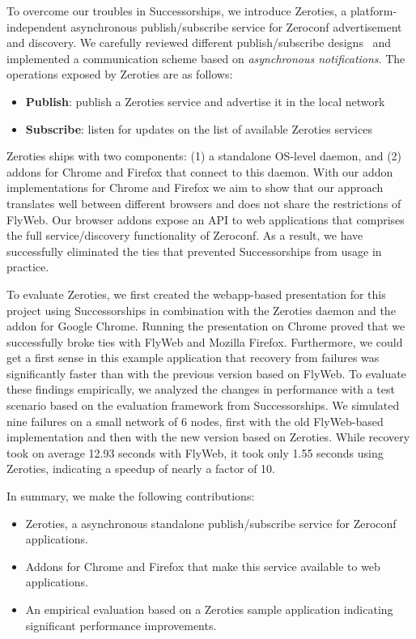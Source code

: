 To overcome our troubles in Successorships, we introduce Zeroties, a platform-independent asynchronous publish/subscribe service for Zeroconf advertisement and discovery.
We carefully reviewed different publish/subscribe designs~\cite{eugster_2003} and implemented a communication scheme based on \textit{asynchronous notifications}.
The operations exposed by Zeroties are as follows:
\begin{itemize}
    \item \textbf{Publish}: publish a Zeroties service and advertise it in the local network
    \item \textbf{Subscribe}: listen for updates on the list of available Zeroties services
\end{itemize}

Zeroties ships with two components: (1) a standalone OS-level daemon, and (2) addons for Chrome and Firefox that connect to this daemon.
With our addon implementations for Chrome and Firefox we aim to show that our approach translates well between different browsers and does not share the restrictions of FlyWeb.
Our browser addons expose an API to web applications that comprises the full service/discovery functionality of Zeroconf.
As a result, we have successfully eliminated the ties that prevented Successorships from usage in practice.

To evaluate Zeroties, we first created the webapp-based presentation for this project using Successorships in combination with the Zeroties daemon and the addon for Google Chrome.
Running the presentation on Chrome proved that we successfully broke ties with FlyWeb and Mozilla Firefox.
Furthermore, we could get a first sense in this example application that recovery from failures was significantly faster than with the previous version based on FlyWeb.
To evaluate these findings empirically, we analyzed the changes in performance with a test scenario based on the evaluation framework from Successorships.
We simulated nine failures on a small network of 6 nodes, first with the old FlyWeb-based implementation and then with the new version based on Zeroties.
While recovery took on average 12.93 seconds with FlyWeb, it took only 1.55 seconds using Zeroties, indicating a speedup of nearly a factor of 10.

In summary, we make the following contributions:
\begin{itemize}
    \item Zeroties, a asynchronous standalone publish/subscribe service for Zeroconf applications.
    \item Addons for Chrome and Firefox that make this service available to web applications.
    \item An empirical evaluation based on a Zeroties sample application indicating significant performance improvements.
\end{itemize}

